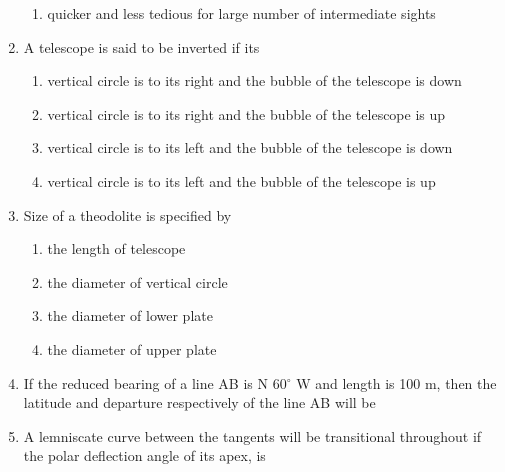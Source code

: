 \documentclass[11pt,a4paper]{article}
\begin{document}
\begin{enumerate}
\begin{enumerate}[label=\Alph*.]
\item{quicker and less tedious for large number of intermediate sights}
\end{enumerate}
\item{A telescope is said to be inverted if its}
\begin{enumerate}[label=\Alph*.]
\item{vertical circle is to its right and the bubble of the telescope is down}
\item{vertical circle is to its right and the bubble of the telescope is up}
\item{vertical circle is to its left and the bubble of the telescope is down}
\item{vertical circle is to its left and the bubble of the telescope is up}
\end{enumerate}
\item{Size of a theodolite is specified by}
\begin{enumerate}[label=\Alph*.]
\item{the length of telescope}
\item{the diameter of vertical circle}
\item{the diameter of lower plate}
\item{the diameter of upper plate}
\end{enumerate}
\item{If the reduced bearing of a line AB is N 60$^\circ$ W and length is 100 m, then the latitude and departure respectively of the line AB will be
}
\\
\item{A lemniscate curve between the tangents will be transitional throughout if the polar deflection angle of its apex, is}
\\

\end{enumerate}
\end{document}

